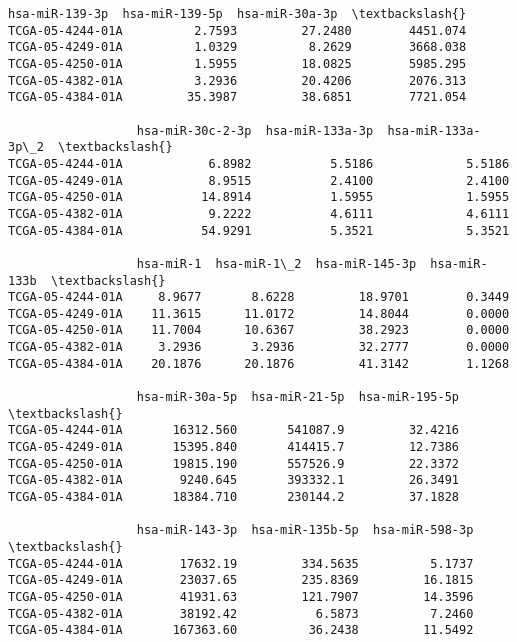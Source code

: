 \documentclass[11pt]{article}
\makeatletter
\newcommand{\boxspacing}{\kern\kvtcb@left@rule\kern\kvtcb@boxsep}
\newcommand{\prompt}[4]{
        \ttfamily\llap{{\color{#2}[#3]:\hspace{3pt}#4}}\vspace{-\baselineskip}
    }
\makeatother
\begin{document}
            \begin{tcolorbox}[breakable, size=fbox, boxrule=.5pt, pad at break*=1mm, opacityfill=0]
\prompt{Out}{outcolor}{139}{\boxspacing}
\begin{Verbatim}[commandchars=\\\{\}]
                  hsa-miR-139-3p  hsa-miR-139-5p  hsa-miR-30a-3p  \textbackslash{}
TCGA-05-4244-01A          2.7593         27.2480        4451.074
TCGA-05-4249-01A          1.0329          8.2629        3668.038
TCGA-05-4250-01A          1.5955         18.0825        5985.295
TCGA-05-4382-01A          3.2936         20.4206        2076.313
TCGA-05-4384-01A         35.3987         38.6851        7721.054

                  hsa-miR-30c-2-3p  hsa-miR-133a-3p  hsa-miR-133a-3p\_2  \textbackslash{}
TCGA-05-4244-01A            6.8982           5.5186             5.5186
TCGA-05-4249-01A            8.9515           2.4100             2.4100
TCGA-05-4250-01A           14.8914           1.5955             1.5955
TCGA-05-4382-01A            9.2222           4.6111             4.6111
TCGA-05-4384-01A           54.9291           5.3521             5.3521

                  hsa-miR-1  hsa-miR-1\_2  hsa-miR-145-3p  hsa-miR-133b  \textbackslash{}
TCGA-05-4244-01A     8.9677       8.6228         18.9701        0.3449
TCGA-05-4249-01A    11.3615      11.0172         14.8044        0.0000
TCGA-05-4250-01A    11.7004      10.6367         38.2923        0.0000
TCGA-05-4382-01A     3.2936       3.2936         32.2777        0.0000
TCGA-05-4384-01A    20.1876      20.1876         41.3142        1.1268

                  hsa-miR-30a-5p  hsa-miR-21-5p  hsa-miR-195-5p  \textbackslash{}
TCGA-05-4244-01A       16312.560       541087.9         32.4216
TCGA-05-4249-01A       15395.840       414415.7         12.7386
TCGA-05-4250-01A       19815.190       557526.9         22.3372
TCGA-05-4382-01A        9240.645       393332.1         26.3491
TCGA-05-4384-01A       18384.710       230144.2         37.1828

                  hsa-miR-143-3p  hsa-miR-135b-5p  hsa-miR-598-3p  \textbackslash{}
TCGA-05-4244-01A        17632.19         334.5635          5.1737
TCGA-05-4249-01A        23037.65         235.8369         16.1815
TCGA-05-4250-01A        41931.63         121.7907         14.3596
TCGA-05-4382-01A        38192.42           6.5873          7.2460
TCGA-05-4384-01A       167363.60          36.2438         11.5492


\end{Verbatim}
\end{tcolorbox}
\end{document}
